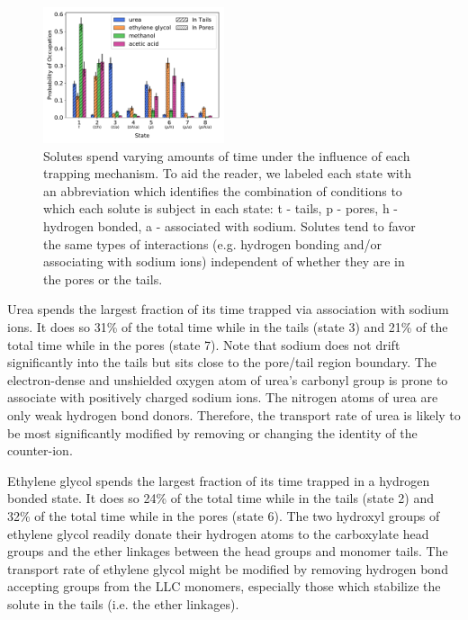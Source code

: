 \documentclass[aps,pre,preprint,groupedaddress,longbibliography]{revtex4-2}
\begin{document}
  \begin{figure}
  \centering
  \includegraphics[width=0.475\textwidth]{state_probabilities.pdf}
  \caption{Solutes spend varying amounts of time under the influence of each
	  trapping mechanism. To aid the reader, we labeled each state with an
	  abbreviation which identifies the combination of conditions to which
	  each solute is subject in each state: t - tails, p - pores, h -
	  hydrogen bonded, a - associated with sodium. Solutes tend to favor
	  the same types of interactions (e.g. hydrogen bonding and/or
	  associating with sodium ions) independent of whether they are in the
	  pores or the tails.}\label{fig:state_probabilities}
  \end{figure}

  Urea spends the largest fraction of its time trapped via association with
  sodium ions. It does so 31\% of the total time while in the tails (state 3)
  and 21\% of the total time while in the pores (state 7). Note that sodium
  does not drift significantly into the tails but sits close to the pore/tail
  region boundary. The electron-dense and unshielded oxygen atom of urea's
  carbonyl group is prone to associate with positively charged sodium ions. The
  nitrogen atoms of urea are only weak hydrogen bond donors. Therefore, the
  transport rate of urea is likely to be most significantly modified by
  removing or changing the identity of the counter-ion.
  
  Ethylene glycol spends the largest fraction of its time trapped in a hydrogen
  bonded state. It does so 24\% of the total time while in the tails (state 2)
  and 32\% of the total time while in the pores (state 6). The two hydroxyl
  groups of ethylene glycol readily donate their hydrogen atoms to the
  carboxylate head groups and the ether linkages between the head groups and
  monomer tails. The transport rate of ethylene glycol might be modified by
  removing hydrogen bond accepting groups from the LLC monomers, especially
  those which stabilize the solute in the tails (i.e. the ether linkages). 
  
\end{document}
